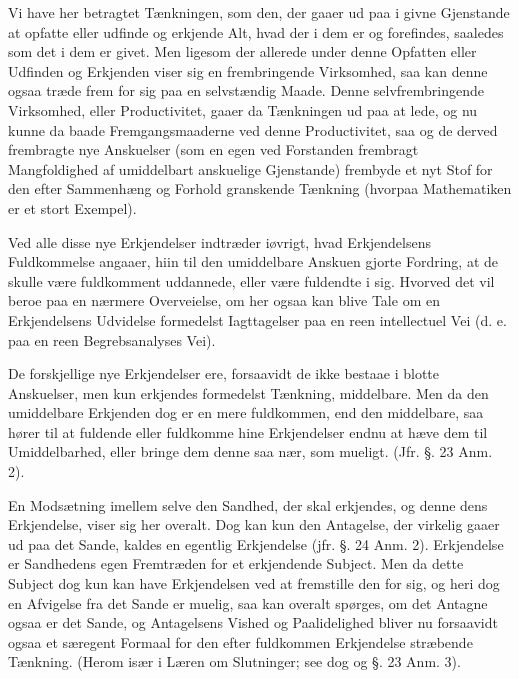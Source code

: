 \documentclass[12pt]{book}
\def\textit#1{#1}%
\def\emph#1{#1}%
\newcommand{\opage}[1]{\marginnote{\footnotesize\textit{[#1]}}}
\begin{document}
\opage{15} Vi have her betragtet Tænkningen, som den, der gaaer ud paa i givne Gjenstande
at opfatte eller udfinde og erkjende Alt, hvad der i dem er og forefindes,
saaledes som det i dem er givet. Men ligesom der allerede under denne Opfatten
eller Udfinden og Erkjenden viser sig en frembringende Virksomhed, saa kan
denne ogsaa træde frem for sig paa en selvstændig Maade. Denne
selvfrembringende Virksomhed, eller \emph{Productivitet}, gaaer da Tænkningen
ud paa at lede, og nu kunne da baade Fremgangsmaaderne ved denne
\emph{Productivitet}, saa og de derved frembragte nye Anskuelser (som en egen
ved Forstanden frembragt Mangfoldighed af umiddelbart anskuelige Gjenstande)
frembyde et nyt Stof for den efter Sammenhæng og Forhold granskende Tænkning
(hvorpaa Mathematiken er et stort Exempel).

Ved alle disse nye Erkjendelser indtræder iøvrigt, hvad Erkjendelsens
Fuldkommelse angaaer, hiin til den umiddelbare Anskuen gjorte Fordring, at de
skulle være fuldkomment uddannede, eller være fuldendte i sig. Hvorved det vil
beroe paa en nærmere Overveielse, om her ogsaa kan blive Tale om en
Erkjendelsens Udvidelse formedelst Iagttagelser paa en reen
\emph{intellectuel Vei} (d. e. paa en reen Begrebsanalyses Vei).

De forskjellige nye Erkjendelser ere, forsaavidt de ikke bestaae i blotte
Anskuelser, men kun erkjendes formedelst Tænkning, middelbare. Men
\opage{16} da den umiddelbare Erkjenden dog er en mere fuldkommen, end den middelbare, saa
hører til at fuldende eller fuldkomme hine Erkjendelser endnu at hæve dem til
Umiddelbarhed, eller bringe dem denne saa nær, som mueligt. (Jfr. §. 23
Anm. 2).

En Modsætning imellem selve den Sandhed, der skal erkjendes, og denne dens
Erkjendelse, viser sig her overalt. Dog kan kun den Antagelse, der virkelig
gaaer ud paa det Sande, kaldes en egentlig Erkjendelse (jfr. §. 24 Anm. 2).
Erkjendelse er Sandhedens egen Fremtræden for et erkjendende Subject. Men da
dette Subject dog kun kan have Erkjendelsen ved at fremstille den for sig, og
heri dog en Afvigelse fra det Sande er muelig, saa kan overalt spørges, om det
Antagne ogsaa er det Sande, og Antagelsens Vished og Paalidelighed bliver nu
forsaavidt ogsaa et særegent Formaal for den efter fuldkommen Erkjendelse
stræbende Tænkning. (Herom især i Læren om Slutninger; see dog og §. 23
Anm. 3).
\end{document}
